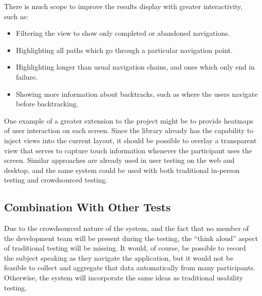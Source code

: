 There is much scope to improve the results display with greater interactivity,
such as:

\begin{itemize}
  \item Filtering the view to show only completed or abandoned navigations.
  \item Highlighting all paths which go through a particular navigation point.
  \item Highlighting longer than usual navigation chains, and ones which only end in failure.
  \item Showing more information about backtracks, such as where the users
        navigate before backtracking.
\end{itemize}


One example of a greater extension to the project might be to provide heatmaps
of user interaction on each screen. Since the library already has the
capability to inject views into the current layout, it should be possible
to overlay a transparent view that serves to capture touch information
whenever the participant uses the screen. Similar approaches are already
used in user testing on the web and desktop, and the same system could
be used with both traditional in-person testing and crowdsourced testing.


\subsection{Combination With Other Tests}

Due to the crowdsourced nature of the system, and the fact that no member of the
development team will be present during the testing, the ``think aloud'' aspect
of traditional testing will be missing. It would, of course, be possible to
record the subject speaking as they navigate the application, but it would not
be feasible to collect and aggregate that data automatically from many
participants. Otherwise, the system will incorporate the same ideas as
traditional usability testing.

